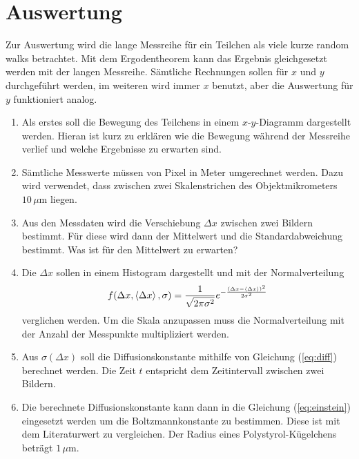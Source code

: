 \section*{Auswertung}

Zur Auswertung wird die lange Messreihe für ein Teilchen als viele kurze random walks betrachtet. Mit dem Ergodentheorem kann das Ergebnis gleichgesetzt werden mit der langen Messreihe.
Sämtliche Rechnungen sollen für $x$ und $y$ durchgeführt werden, im weiteren wird immer $x$ benutzt, aber die Auswertung für $y$ funktioniert analog.

\begin{enumerate}
\item Als erstes soll die Bewegung des Teilchens in einem $x$-$y$-Diagramm dargestellt werden. Hieran ist kurz zu erklären wie die Bewegung während der Messreihe verlief und welche Ergebnisse zu erwarten sind.

\item Sämtliche Messwerte müssen von Pixel in Meter umgerechnet werden. Dazu wird verwendet, dass zwischen zwei Skalenstrichen des Objektmikrometers $10\, \mu$m liegen.

\item Aus den Messdaten wird die Verschiebung $\Delta x$ zwischen zwei Bildern bestimmt. Für diese wird dann der Mittelwert und die Standardabweichung bestimmt. Was ist für den Mittelwert zu erwarten?

\item Die $\Delta x$ sollen in einem Histogram dargestellt und mit der Normalverteilung
\begin{equation}
  f(\Delta x, \left< \Delta x \right>, \sigma) = \frac{1}{\sqrt{2 \pi \sigma^2}} e^{- \frac{(\Delta x - \left< \Delta x \right>)^2}{2 \sigma^2}}
\end{equation}
verglichen werden. Um die Skala anzupassen muss die Normalverteilung mit der Anzahl der Messpunkte multipliziert werden.

\item Aus $\sigma(\Delta x)$ soll die Diffusionskonstante mithilfe von Gleichung (\ref{eq:diff}) berechnet werden. Die Zeit $t$ entspricht dem Zeitintervall zwischen zwei Bildern.

\item Die berechnete Diffusionskonstante kann dann in die Gleichung (\ref{eq:einstein}) eingesetzt werden um die Boltzmannkonstante zu bestimmen. Diese ist mit dem Literaturwert zu vergleichen. Der Radius eines Polystyrol-Kügelchens beträgt $1\,\mu$m.
\end{enumerate}

